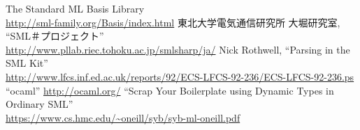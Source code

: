 \documentclass[11pt,a4paper]{jarticle}
\begin{document}
\begin{thebibliography}{9}
   The Standard ML Basis Library \\
    \url{http://sml-family.org/Basis/index.html}
   東北大学電気通信研究所 大堀研究室, ``SML＃プロジェクト''\\
    \url{http://www.pllab.riec.tohoku.ac.jp/smlsharp/ja/}
   Nick Rothwell, ``Parsing in the SML Kit'' \\
    \url{http://www.lfcs.inf.ed.ac.uk/reports/92/ECS-LFCS-92-236/ECS-LFCS-92-236.ps}
   ``ocaml''
    \url{http://ocaml.org/}
   ``Scrap Your Boilerplate using Dynamic Types in Ordinary SML'' \\
    \url{https://www.cs.hmc.edu/~oneill/syb/syb-ml-oneill.pdf}

\end{thebibliography}
\end{document}
